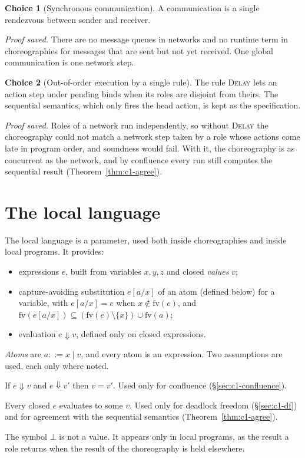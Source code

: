 \documentclass[11pt]{report}
\theoremstyle{plain}
\theoremstyle{definition}
\newtheorem{choice}{Choice}[chapter]
\theoremstyle{remark}
\newcommand{\fv}{\mathrm{fv}}
\newcommand{\rn}[1]{{\normalfont\scshape #1}}
\begin{document}
\begin{choice}[Synchronous communication]\label{cho:c1-sync}
  A communication is a single rendezvous between sender and receiver.

  \emph{Proof saved.}  There are no message queues in networks and no runtime
  term in choreographies for messages that are sent but not yet received.
  One global communication is one network step.
\end{choice}

\begin{choice}[Out-of-order execution by a single rule]\label{cho:c1-delay}
  The rule \rn{Delay} lets an action step under pending binds when its roles
  are disjoint from theirs.  The sequential semantics, which only fires the
  head action, is kept as the specification.

  \emph{Proof saved.}  Roles of a network run independently, so without
  \rn{Delay} the choreography could not match a network step taken by a role
  whose actions come late in program order, and soundness would fail.  With
  it, the choreography is as concurrent as the network, and by confluence
  every run still computes the sequential result
  (Theorem~\ref{thm:c1-agree}).
\end{choice}

\section{The local language}
\label{sec:c1-local}

The local language is a parameter, used both inside choreographies and inside
local programs.  It provides:
\begin{itemize}[nosep]
\item expressions $e$, built from variables $x,y,z$ and closed \emph{values} $v$;
\item capture-avoiding substitution $e[a/x]$ of an atom (defined below) for a
  variable, with $e[a/x]=e$ when $x\notin\fv(e)$, and
  $\fv(e[a/x])\subseteq(\fv(e)\setminus\{x\})\cup\fv(a)$;
\item evaluation $e\Downarrow v$, defined only on closed expressions.
\end{itemize}
\emph{Atoms} are $a ::= x \mid v$, and every atom is an expression.  Two
assumptions are used, each only where noted.
\begin{description}[nosep,font=\normalfont\itshape]
\item[(L1) Determinism.] If $e\Downarrow v$ and $e\Downarrow v'$ then
  $v=v'$.  Used only for confluence (\S\ref{sec:c1-confluence}).
\item[(L2) Totality.] Every closed $e$ evaluates to some $v$.  Used only for
  deadlock freedom (\S\ref{sec:c1-df}) and for agreement with the sequential
  semantics (Theorem~\ref{thm:c1-agree}).
\end{description}
The symbol $\bot$ is not a value.  It appears only in local programs, as the
result a role returns when the result of the choreography is held elsewhere.
\end{document}
